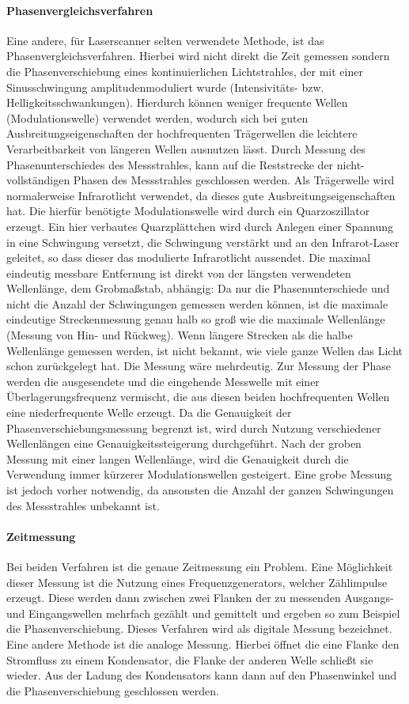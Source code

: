 \documentclass[a4paper,12pt,bibliography=totoc, listof=totoc,titlepage,pointlessnumbers]{scrreprt}
\begin{document}
\paragraph{Phasenvergleichsverfahren}
Eine andere, für Laser\-scan\-ner selten verwendete Methode, ist das Phasenvergleichsverfahren. Hierbei wird nicht direkt die Zeit gemessen sondern die Phasenverschiebung eines kontinuierlichen Lichtstrahles, der mit einer Sinusschwingung amplitudenmoduliert wurde (Intensivitäts- bzw. Helligkeitsschwankungen). Hierdurch können weniger frequente Wellen (Modulationswelle) verwendet werden, wodurch sich bei guten Ausbreitungseigenschaften der hochfrequenten Trägerwellen die leichtere Verarbeitbarkeit von längeren Wellen ausnutzen lässt. Durch Messung des Phasenunterschiedes des Messstrahles, kann auf die Reststrecke der nicht-vollständigen Phasen des Messstrahles geschlossen werden. Als Trägerwelle wird normalerweise Infrarotlicht verwendet, da dieses gute Ausbreitungseigenschaften hat. Die hierfür benötigte Modulationswelle wird durch ein Quarzoszillator erzeugt. Ein hier verbautes Quarzplättchen wird durch Anlegen einer Spannung in eine Schwingung versetzt, die Schwingung verstärkt und an den Infrarot-Laser geleitet, so dass dieser das modulierte Infrarotlicht aussendet. Die maximal eindeutig messbare Entfernung ist direkt von der längsten verwendeten Wellenlänge, dem Grobmaßstab, abhängig: Da nur die Phasenunterschiede und nicht die Anzahl der Schwingungen gemessen werden können, ist die maximale eindeutige  Streckenmessung genau halb so groß wie die maximale Wellenlänge (Messung von Hin- und Rückweg). Wenn längere Strecken als die halbe Wellenlänge gemessen werden, ist nicht bekannt, wie viele ganze Wellen das Licht schon zurückgelegt hat. Die Messung wäre mehrdeutig. Zur Messung der Phase werden die ausgesendete und die eingehende Messwelle mit einer Überlagerungsfrequenz vermischt, die aus diesen beiden hochfrequenten Wellen eine niederfrequente Welle erzeugt. Da die Genauigkeit der Phasenverschiebungsmessung begrenzt ist, wird durch Nutzung verschiedener Wellenlängen eine Genauigkeitssteigerung durchgeführt. Nach der groben Messung mit einer langen Wellenlänge, wird die Genauigkeit durch die Verwendung immer kürzerer Modulationswellen gesteigert. Eine grobe Messung ist jedoch vorher notwendig, da ansonsten die Anzahl der ganzen Schwingungen des Messstrahles unbekannt ist. \citep[S. 311ff]{Witte2006}

\paragraph{Zeitmessung}
Bei beiden Verfahren ist die genaue Zeitmessung ein Problem. Eine Möglichkeit dieser Messung ist die Nutzung eines Frequenzgenerators, welcher Zählimpulse erzeugt. Diese werden dann zwischen zwei Flanken der zu messenden Ausgangs- und Eingangswellen mehrfach gezählt und gemittelt und ergeben so zum Beispiel die Phasenverschiebung. Dieses Verfahren wird als digitale Messung bezeichnet. Eine andere Methode ist die analoge Messung. Hierbei öffnet die eine Flanke den Stromfluss zu einem Kondensator, die Flanke der anderen Welle schließt sie wieder. Aus der Ladung des Kondensators kann dann auf den Phasenwinkel und die Phasenverschiebung geschlossen werden.  \citep[S. 314f]{Witte2006}
\end{document}
